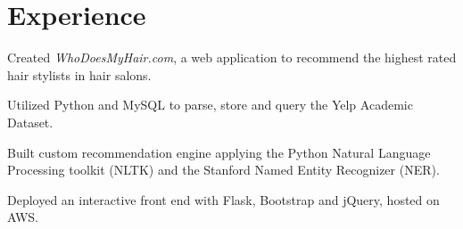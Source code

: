 \documentclass[letterpaper]{deedy-resume} %
\begin{document}
\hfill
%
%
\begin{minipage}[t]{0.66\textwidth} %


\section{Experience}


\vspace{\topsep} %
\begin{tightitemize}
\item Created \textit{WhoDoesMyHair.com}, a web application to recommend the highest rated hair stylists in hair salons.
\item Utilized Python and MySQL to parse, store and query the Yelp Academic Dataset.
\item Built custom recommendation engine applying the Python Natural Language Processing toolkit (NLTK) and the Stanford Named Entity Recognizer (NER).
\item Deployed an interactive front end with Flask, Bootstrap and jQuery, hosted on AWS.
\end{tightitemize}

\sectionspace %




\end{minipage}
\end{document}
